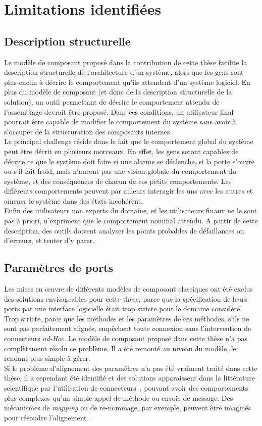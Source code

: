 \section{Limitations identifiées}

\subsection{Description structurelle}

Le modèle de composant proposé dans la contribution de cette thèse facilite la description structurelle de l'architecture d'un système, alors que les gens sont plus enclin à décrire le comportement qu'ils attendent d'un système logiciel. En plus du modèle de composant (et donc de la description structurelle de la solution), un outil permettant de décrire le comportement attendu de l'assemblage devrait être proposé. Dans ces conditions, un utilisateur final pourrait être capable de modifier le comportement du système sans avoir à s'occuper de la structuration des composants internes.\\
Le principal challenge réside dans le fait que le comportement global du système peut être décrit en plusieurs morceaux. En effet, les gens seront capables de décrire ce que le système doit faire si une alarme se déclenche, si la porte s'ouvre ou s'il fait froid, mais n'auront pas une vision globale du comportement du système, et des conséquences de chacun de ces petits comportements. Les différents comportements peuvent par ailleurs interagir les uns avec les autres et amener le système dans des états incohérent.\\
Enfin des utilisateurs non experts du domaine, et les utilisateurs finaux ne le sont pas à priori, n'expriment que le comportement nominal attendu. A partir de cette description, des outils doivent analyser les points probables de défaillances ou d'erreurs, et tenter d'y parer.

\subsection{Paramètres de ports}
Les mises en \oe uvre de différents modèles de composant classiques ont été exclus des solutions envisageables pour cette thèse, parce que la spécification de leurs ports par une interface logicielle était trop stricte pour le domaine considéré. Trop stricte, parce que les méthodes et les paramètres de ces méthodes, s'ils ne sont pas parfaitement alignés, empêchent toute connexion sans l'intervention de connecteurs {\it ad-Hoc}. Le modèle de composant proposé dans cette thèse n'a pas complètement résolu ce problème. Il a été remonté au niveau du modèle, le rendant plus simple à gérer.\\
Si le problème d'alignement des paramètres n'a pas été vraiment traité dans cette thèse, il a cependant été identifié et des solutions apparaissent dans la littérature scientifique par l'utilisation de connecteurs~\cite{Matougui:2005}, pouvant avoir des comportements plus complexes qu'un simple appel de méthode ou envoie de message. Des mécanismes de {\it mapping} ou de re-nommage, par exemple, peuvent être imaginés pour résoudre l'alignement~\cite{Clavreul:2010}.



